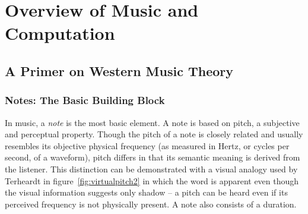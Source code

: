 \chapter{Overview of Music and Computation}

\section{A Primer on Western Music Theory}

\subsection{Notes: The Basic Building Block}

In music, a \textit{note} is the most basic element. A note is based on pitch, a subjective and perceptual property. Though the pitch of a note is closely related and usually resembles its objective physical frequency (as measured in Hertz, or cycles per second, of a waveform), pitch differs in that its semantic meaning is derived from the listener. This distinction can be demonstrated with a visual analogy used by Terheardt\cite{terhardt1974pitch} in figure~\ref{fig:virtualpitch2} in which the word  is apparent even though the visual information suggests only shadow -- a pitch can be heard even if its perceived frequency is not physically present. A note also consists of a duration.